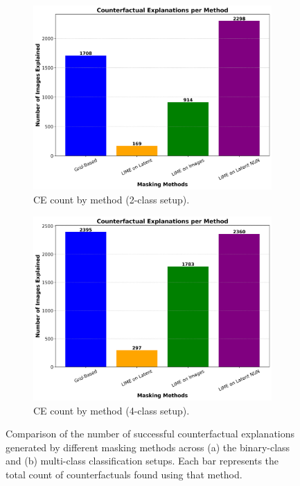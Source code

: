 \begin{figure}[htbp]
    \centering
    \begin{subfigure}{0.48\textwidth}
        \centering
        \includegraphics[width=\textwidth]{img/masking_results/bar_chart_explanations_2_class.png}
        \caption{CE count by method (2-class setup).}
        \label{fig:ce_count_binary}
    \end{subfigure}
    \hfill
    \begin{subfigure}{0.48\textwidth}
        \centering
        \includegraphics[width=\textwidth]{img/masking_results/bar_chart_explanations_4_class.png}
        \caption{CE count by method (4-class setup).}
        \label{fig:bar_chart_ce_count_multi}
    \end{subfigure}
    \caption[Number of counterfactuals found by method (binary vs multi-class)]{%
Comparison of the number of successful counterfactual explanations generated by different masking methods across (a) the binary-class and (b) multi-class classification setups. Each bar represents the total count of counterfactuals found using that method.}
    \label{fig:ce_count_comparison}
\end{figure}


